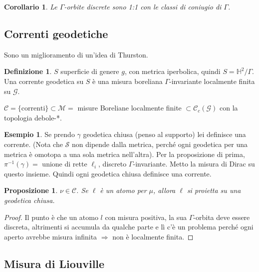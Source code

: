 \documentclass[a4paper]{article}
\newtheorem{proposition}{Proposizione}
\newtheorem{corollary}{Corollario}
\theoremstyle{definition}
\newtheorem{definition}{Definizione}
\newtheorem{example}{Esempio}
\begin{document}
    \begin{corollary}
        Le $\Gamma$-orbite discrete sono 1:1 con le classi di coniugio di $\Gamma$.
    \end{corollary}
    
\subsection{Correnti geodetiche}
    Sono un miglioramento di un'idea di Thurston.

    \begin{definition}
        $S$ superficie di genere $g$, con metrica iperbolica, quindi $S = \mathbb H^2 /\Gamma$. Una corrente geodetica su $S$ è una misura boreliana $\Gamma$-invariante localmente finita su $\mathcal G$.
    \end{definition}

    $\mathcal C = \{\textrm{correnti}\} \subset \mathcal M =$ misure Boreliane localmente finite $\subset \mathcal C_{c} (\mathcal G)$ con la topologia debole-*.

    \begin{example}
        Se prendo $\gamma$ geodetica chiusa (penso al supporto) lei definisce una corrente. (Nota che $\mathcal S$ non dipende dalla metrica, perché ogni geodetica per una metrica è omotopa a una sola metrica nell'altra). Per la proposizione di prima, $\pi^{-1}(\gamma) =$ unione di rette $\ell_{i}$, discreto $\Gamma$-invariante. Metto la misura di Dirac su questo insieme. Quindi ogni geodetica chiusa definisce una corrente.
    \end{example}

    \begin{proposition}
        $\nu \in \mathcal C$. Se $\ell$ è un atomo per $\mu$, allora $\ell$ si proietta su una geodetica chiusa.
    \end{proposition}

    \begin{proof}
        Il punto è che un atomo $l$ con misura positiva, la sua $\Gamma$-orbita deve essere discreta, altrimenti si accumula da qualche parte e lì c'è un problema perché ogni aperto avrebbe misura infinita $\Rightarrow$ non è localmente finita.
    \end{proof}

\subsection{Misura di Liouville}
\end{document}
